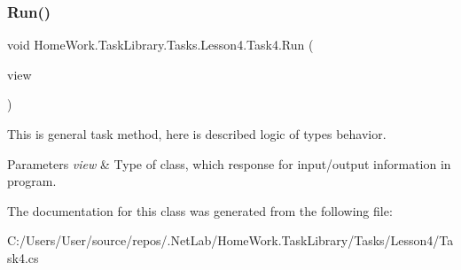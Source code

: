 \subsubsection{\texorpdfstring{Run()}{Run()}}
{\footnotesize\ttfamily void Home\+Work.\+Task\+Library.\+Tasks.\+Lesson4.\+Task4.\+Run (\begin{DoxyParamCaption}\item[{I\+Information}]{view }\end{DoxyParamCaption})}



This is general task method, here is described logic of types behavior. 


\begin{DoxyParams}{Parameters}
{\em view} & Type of class, which response for input/output information in program.\\
\hline
\end{DoxyParams}


The documentation for this class was generated from the following file\+:\begin{DoxyCompactItemize}
\item 
C\+:/\+Users/\+User/source/repos/.\+Net\+Lab/\+Home\+Work.\+Task\+Library/\+Tasks/\+Lesson4/Task4.\+cs\end{DoxyCompactItemize}
